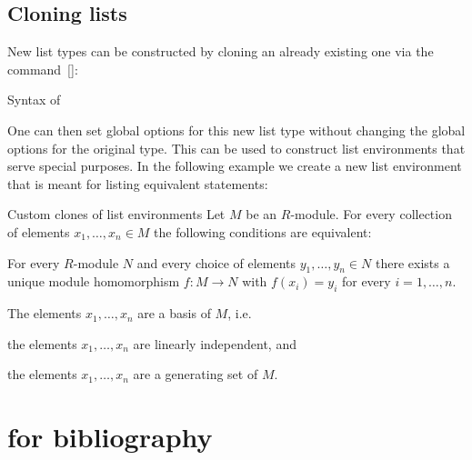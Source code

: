 \subsection{Cloning lists}
New list types can be constructed by cloning an already existing one via the command~[\comname]:
\begin{showcode}{Syntax of }
    \end{showcode}
    One can then set global options for this new list type without changing the global options for the original type.
    This can be used to construct list environments that serve special purposes.
    In the following example we create a new list environment that is meant for listing equivalent statements:
    \begin{showlatex}{Custom clones of list environments}
Let $M$ be an $R$-module.
For every collection of elements $x_1, \dotsc, x_n \in M$ the following conditions are equivalent:
\begin{equivalenceslist}
  \item
    For every $R$-module $N$ and every choice of elements $y_1, \dotsc, y_n \in N$ there exists a unique module homomorphism $f \colon M \to N$ with $f(x_i) = y_i$ for every $i = 1, \dotsc, n$.
  \item
    The elements $x_1, \dotsc, x_n$ are a basis of $M$, i.e.
    \begin{equivalenceslist}
      \item
        the elements $x_1, \dotsc, x_n$ are linearly independent, and
      \item
        the elements $x_1, \dotsc, x_n$ are a generating set of $M$.
    \end{equivalenceslist}
\end{equivalenceslist}
\end{showlatex}





\section{ for bibliography}



